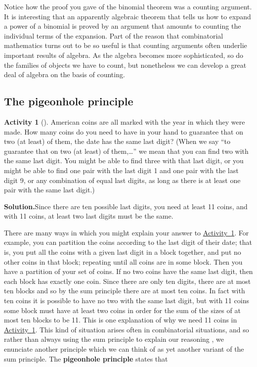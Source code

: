 \documentclass[10pt,]{book}
\newcommand{\terminology}[1]{\textbf{#1}}
\theoremstyle{plain}
\theoremstyle{definition}
\newtheorem{activity}[project]{Activity}
\numberwithin{equation}{chapter}
\begin{document}
Notice how the proof you gave of the binomial theorem was a counting argument. It is interesting that an apparently algebraic theorem that tells us how to expand a power of a binomial is proved by an argument that amounts to counting the individual terms of the expansion. Part of the reason that combinatorial mathematics turns out to be so useful is that counting arguments often underlie important results of algebra. As the algebra becomes more sophisticated, so do the families of objects we have to count, but nonetheless we can develop a great deal of algebra on the basis of counting.%
\typeout{************************************************}
\typeout{************************************************}
\subsection[{The pigeonhole principle}]{The pigeonhole principle}\label{subsection-9}
\begin{activity}[]\label{elevencoins}
American coins are all marked with the year in which they were made. How many coins do you need to have in your hand to guarantee that on two (at least) of them, the date has the same last digit? (When we say ``to guarantee that on two (at least) of them,\dots{}'' we mean that you can find two with the same last digit. You might be able to find three with that last digit, or you might be able to find one pair with the last digit 1 and one pair with the last digit 9, or any combination of equal last digits, as long as there is at least one pair with the same last digit.)%
\par\medskip\noindent%
\textbf{Solution.}\quad Since there are ten possible last digits, you need at least 11 coins, and with 11 coins, at least two last digits must be the same.%
\end{activity}
There are many ways in which you might explain your answer to \hyperref[elevencoins]{Activity~\ref{elevencoins}}. For example, you can partition the coins according to the last digit of their date; that is, you put all the coins with a given last digit in a block together, and put no other coins in that block; repeating until all coins are in some block. Then you have a partition of your set of coins. If no two coins have the same last digit, then each block has exactly one coin. Since there are only ten digits, there are at most ten blocks and so by the sum principle there are at most ten coins. In fact with ten coins it is possible to have no two with the same last digit, but with 11 coins some block must have at least two coins in order for the sum of the sizes of at most ten blocks to be 11. This is one explanation of why we need 11 coins in \hyperref[elevencoins]{Activity~\ref{elevencoins}}. This kind of situation arises often in combinatorial situations, and so rather than always using the sum principle to explain our reasoning , we enunciate another principle which we can think of as yet another variant of the sum principle. The \terminology{pigeonhole principle} states that%
\end{document}
